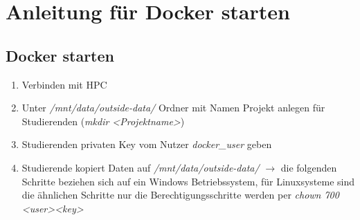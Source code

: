 \chapter{Anleitung für Docker starten}
\section{Docker starten}
\begin{enumerate}
    \item Verbinden mit HPC 
    \item Unter \textit{/mnt/data/outside-data/} Ordner mit Namen Projekt anlegen für Studierenden (\textit{mkdir \textless Projektname\textgreater})
    \item Studierenden privaten Key vom Nutzer \textit{docker\_user} geben
    \item Studierende kopiert Daten auf \textit{/mnt/data/outside-data/} $\rightarrow$ die folgenden Schritte beziehen sich auf ein Windows Betriebssystem, für Linuxsysteme sind die ähnlichen Schritte nur die Berechtigungsschritte werden per \textit{chown 700 \textless user\textgreater \textless key\textgreater}
    

\end{enumerate}
